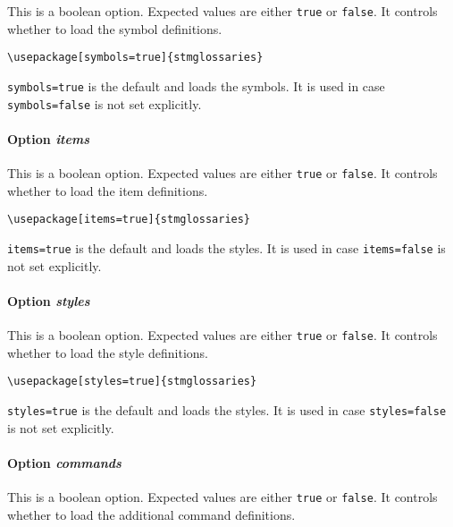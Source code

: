 \documentclass[%
  type=article,%
  layout=koma,%
  hyperref=true,%
  conditionallox=true,%
  conditionalloxnewpage=false,%
  date=true,%
  index=true,%
  listings=true%
]{stmtext}
\begin{document}
This is a boolean option. Expected values are either \texttt{true} or \texttt{false}. It controls whether to load the symbol definitions.

\begin{verbatim}
\usepackage[symbols=true]{stmglossaries}
\end{verbatim}

\texttt{symbols=true} is the default and loads the symbols. It is used in case \texttt{symbols=false} is not set explicitly.

\paragraph{Option \protect\textit{items}}
\label{sec:usage:preamble:wholepackage:options:items}

This is a boolean option. Expected values are either \texttt{true} or \texttt{false}. It controls whether to load the item definitions.

\begin{verbatim}
\usepackage[items=true]{stmglossaries}
\end{verbatim}

\texttt{items=true} is the default and loads the styles. It is used in case \texttt{items=false} is not set explicitly.

\paragraph{Option \protect\textit{styles}}
\label{sec:usage:preamble:wholepackage:options:styles}

This is a boolean option. Expected values are either \texttt{true} or \texttt{false}. It controls whether to load the style definitions.

\begin{verbatim}
\usepackage[styles=true]{stmglossaries}
\end{verbatim}

\texttt{styles=true} is the default and loads the styles. It is used in case \texttt{styles=false} is not set explicitly.

\paragraph{Option \protect\textit{commands}}
\label{sec:usage:preamble:wholepackage:options:commands}

This is a boolean option. Expected values are either \texttt{true} or \texttt{false}. It controls whether to load the additional command definitions.
\end{document}
